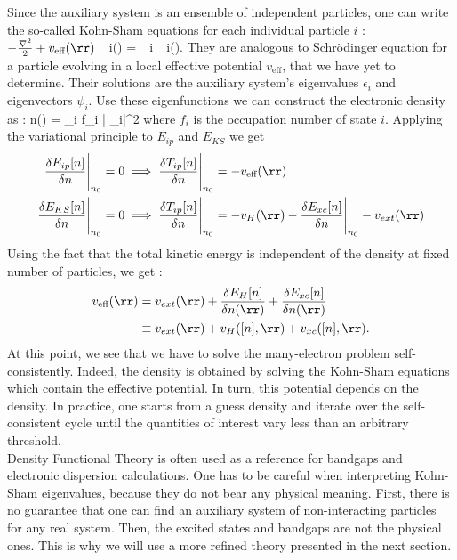 Since the auxiliary system is an ensemble of independent particles, one can write the so-called Kohn-Sham equations for each individual particle $i$ :
\be
 	\( -\frac{\nabla^2}{2} + v_{\text{eff}}(\rr)\) \psi_i(\rr) = \epsilon_i \psi_i(\rr).
\ee
They are analogous to Schrödinger equation for a particle evolving in a local effective potential $v_{\text{eff}}$, that we have yet to determine. Their solutions are the auxiliary system's eigenvalues $\epsilon_i$ and eigenvectors $\psi_i$. Use these eigenfunctions we can construct the electronic density as  :
\be
 	n(\rr) = \sum_i f_i \left| \psi_i\right|^2 \label{eq:DFT_n_vs_psi}
\ee
where $f_i$ is the occupation number of state $i$. 
Applying the variational principle to $E_{ip}$ and $E_{KS}$ we get 
\begin{align}
    \frac{\delta E_{ip}[n]}{\delta n} \Biggr|_{n_0} = 0 &\implies \frac{\delta T_{ip}[n]}{\delta n} \Biggr|_{n_0} = - v_{\text{eff}}(\rr) \\
    \frac{\delta E_{KS}[n]}{\delta n} \Biggr|_{n_0} = 0 &\implies \frac{\delta T_{ip}[n]}{\delta n} \Biggr|_{n_0} = - v_H(\rr) - \frac{\delta E_{xc}[n]}{\delta n} \Biggr|_{n_0} - v_{ext}(\rr)
\end{align}
Using the fact that the total kinetic energy is independent of the density at fixed number of particles, we get :
\begin{align}
\begin{split}
	v_{\text{eff}}(\rr) &= v_{ext}(\rr) + \frac{\delta E_H[n]}{\delta n(\rr)} + \frac{\delta E_{xc}[n]}{\delta n(\rr)} \\
	&\equiv v_{ext}(\rr) + v_H([n],\rr) + v_{xc}([n],\rr).
\end{split}
\end{align}
At this point, we see that we have to solve the many-electron problem self-consistently. Indeed, the density is obtained by solving the Kohn-Sham equations which contain the effective potential. In turn, this potential depends on the density. In practice, one starts from a guess density and iterate over the self-consistent cycle until the quantities of interest vary less than an arbitrary threshold. \\
Density Functional Theory is often used as a reference for bandgaps and electronic dispersion calculations. One has to be careful when interpreting Kohn-Sham eigenvalues, because they do not bear any physical meaning. First, there is no guarantee that one can find an auxiliary system of non-interacting particles for any real system. Then, the excited states and bandgaps are not the physical ones.\cite{fiolhais2003primer} This is why we will use a more refined theory presented in the next section.

